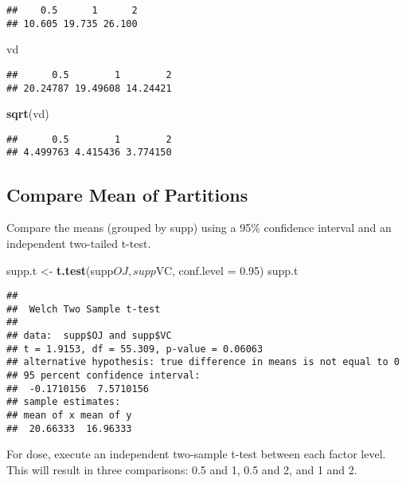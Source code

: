 \documentclass[]{article}
\newenvironment{Shaded}{\begin{snugshade}}{\end{snugshade}}
\newcommand{\KeywordTok}[1]{\textcolor[rgb]{0.13,0.29,0.53}{\textbf{{#1}}}}
\newcommand{\DataTypeTok}[1]{\textcolor[rgb]{0.13,0.29,0.53}{{#1}}}
\newcommand{\FloatTok}[1]{\textcolor[rgb]{0.00,0.00,0.81}{{#1}}}
\newcommand{\StringTok}[1]{\textcolor[rgb]{0.31,0.60,0.02}{{#1}}}
\newcommand{\NormalTok}[1]{{#1}}
\begin{document}
\begin{verbatim}
##    0.5      1      2 
## 10.605 19.735 26.100
\end{verbatim}

\begin{Shaded}
\begin{Highlighting}[]
    \NormalTok{vd}
\end{Highlighting}
\end{Shaded}

\begin{verbatim}
##      0.5        1        2 
## 20.24787 19.49608 14.24421
\end{verbatim}

\begin{Shaded}
\begin{Highlighting}[]
    \KeywordTok{sqrt}\NormalTok{(vd)}
\end{Highlighting}
\end{Shaded}

\begin{verbatim}
##      0.5        1        2 
## 4.499763 4.415436 3.774150
\end{verbatim}

\subsection{Compare Mean of
Partitions}\label{compare-mean-of-partitions}

Compare the means (grouped by supp) using a 95\% confidence interval and
an independent two-tailed t-test.

\begin{Shaded}
\begin{Highlighting}[]
\NormalTok{supp.t <-}\StringTok{ }\KeywordTok{t.test}\NormalTok{(supp$OJ, supp$VC, }\DataTypeTok{conf.level =} \FloatTok{0.95}\NormalTok{)}
\NormalTok{supp.t}
\end{Highlighting}
\end{Shaded}

\begin{verbatim}
## 
##  Welch Two Sample t-test
## 
## data:  supp$OJ and supp$VC
## t = 1.9153, df = 55.309, p-value = 0.06063
## alternative hypothesis: true difference in means is not equal to 0
## 95 percent confidence interval:
##  -0.1710156  7.5710156
## sample estimates:
## mean of x mean of y 
##  20.66333  16.96333
\end{verbatim}

For dose, execute an independent two-sample t-test between each factor
level. This will result in three comparisons: 0.5 and 1, 0.5 and 2, and
1 and 2.
\end{document}
